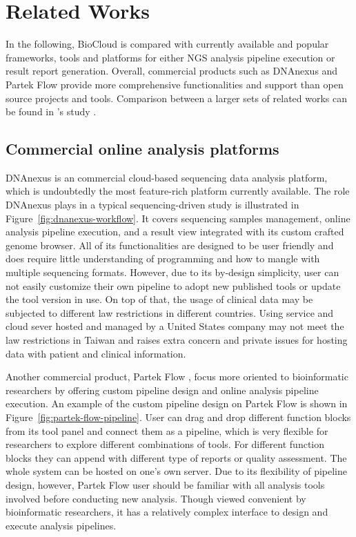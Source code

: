 \chapter{Related Works}
\label{c:related-work}

In the following, BioCloud is compared with currently available and popular
frameworks, tools and platforms for either NGS analysis pipeline execution or
result report generation. Overall, commercial products such as DNAnexus and
Partek Flow provide more comprehensive functionalities and support than open
source projects and tools. Comparison between a larger sets of related works
can be found in \citeauthor{leipzig2016:review}'s study
\cite{leipzig2016:review}.


\section{Commercial online analysis platforms}

DNAnexus \cite{:dnanexus} is an commercial cloud-based sequencing data analysis
platform, which is undoubtedly the most feature-rich platform currently
available. The role DNAnexus plays in a typical sequencing-driven study is
illustrated in Figure~\ref{fig:dnanexus-workflow}. It covers sequencing samples
management, online analysis pipeline execution, and a result view integrated
with its custom crafted genome browser. All of its functionalities are designed
to be user friendly and does require little understanding of programming and
how to mangle with multiple sequencing formats. However, due to its by-design
simplicity, user can not easily customize their own pipeline to adopt new
published tools or update the tool version in use. On top of that, the usage of
clinical data may be subjected to different law restrictions in different
countries. Using service and cloud sever hosted and managed by a United States
company may not meet the law restrictions in Taiwan and raises extra concern
and private issues for hosting data with patient and clinical information.



Another commercial product, Partek Flow \cite{:partek}, focus more oriented to
bioinformatic researchers by offering custom pipeline design and online
analysis pipeline execution. An example of the custom pipeline design on Partek
Flow is shown in Figure~\ref{fig:partek-flow-pipeline}. User can drag and drop
different function blocks from its tool panel and connect them as a pipeline,
which is very flexible for researchers to explore different combinations of
tools. For different function blocks they can append with different type of
reports or quality assessment. The whole system can be hosted on one's own
server. Due to its flexibility of pipeline design, however, Partek Flow user
should be familiar with all analysis tools involved before conducting new
analysis. Though viewed convenient by bioinformatic researchers, it has a
relatively complex interface to design and execute analysis pipelines.

